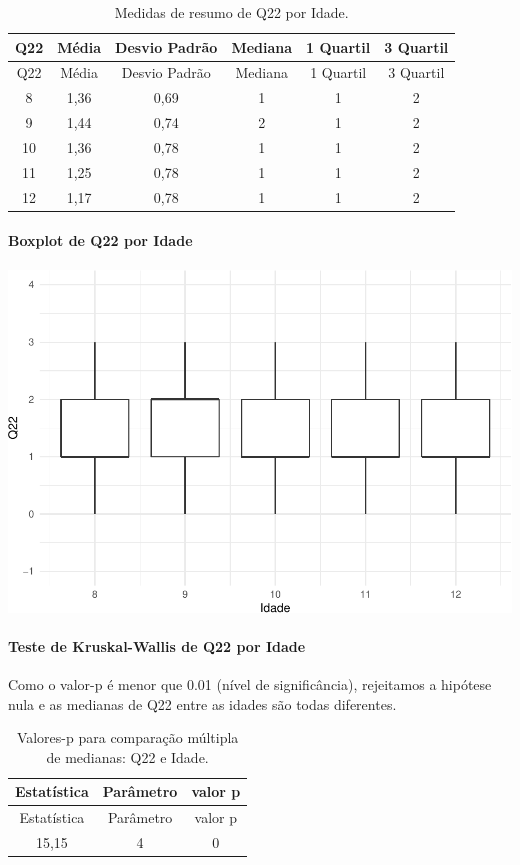 \documentclass[]{article}
\let\oldparagraph\paragraph
\renewcommand{\paragraph}[1]{\oldparagraph{#1}\mbox{}}
\begin{document}
\begin{longtable}[]{@{}cccccc@{}}
\caption{\label{tab:unnamed-chunk-508}Medidas de resumo de Q22 por Idade.}\tabularnewline
\toprule
Q22 & Média & Desvio Padrão & Mediana & 1 Quartil & 3 Quartil\tabularnewline
\midrule
\endfirsthead
\toprule
Q22 & Média & Desvio Padrão & Mediana & 1 Quartil & 3 Quartil\tabularnewline
\midrule
\endhead
8 & 1,36 & 0,69 & 1 & 1 & 2\tabularnewline
9 & 1,44 & 0,74 & 2 & 1 & 2\tabularnewline
10 & 1,36 & 0,78 & 1 & 1 & 2\tabularnewline
11 & 1,25 & 0,78 & 1 & 1 & 2\tabularnewline
12 & 1,17 & 0,78 & 1 & 1 & 2\tabularnewline
\bottomrule
\end{longtable}

\hypertarget{boxplot-de-q22-por-idade}{%
\paragraph{Boxplot de Q22 por Idade}\label{boxplot-de-q22-por-idade}}

\begin{center}\includegraphics[width=0.75\linewidth]{relatorio_covid19_files/figure-latex/unnamed-chunk-509-1} \end{center}

\hypertarget{teste-de-kruskal-wallis-de-q22-por-idade}{%
\paragraph{Teste de Kruskal-Wallis de Q22 por Idade}\label{teste-de-kruskal-wallis-de-q22-por-idade}}

Como o valor-p é menor que 0.01 (nível de significância), rejeitamos a hipótese nula e as medianas de Q22 entre as idades são todas diferentes.

\begin{longtable}[]{@{}ccc@{}}
\caption{\label{tab:unnamed-chunk-511}Valores-p para comparação múltipla de medianas: Q22 e Idade.}\tabularnewline
\toprule
Estatística & Parâmetro & valor p\tabularnewline
\midrule
\endfirsthead
\toprule
Estatística & Parâmetro & valor p\tabularnewline
\midrule
\endhead
15,15 & 4 & 0\tabularnewline
\bottomrule
\end{longtable}
\end{document}
